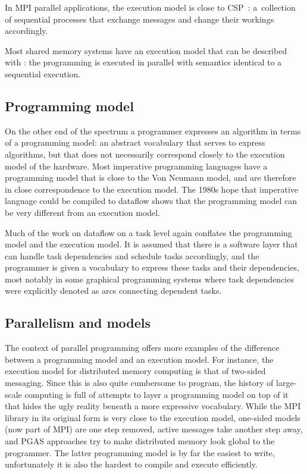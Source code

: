 \documentclass[11pt,fleqn,preprint]{impreport}
\begin{document}
In MPI parallel applications, the execution model is close to
\acf{CSP}~\cite{Hoare:csp}: a~collection of sequential processes that
exchange messages and change their workings accordingly.

Most shared memory systems have an execution model that can be described
with : the programming is executed in parallel
with semantics identical to a sequential execution.

\subsection{Programming model}

On the other end of the spectrum a programmer expresses an algorithm
in terms of a programming model: an abstract vocabulary that serves
to express algorithms, but that does not necessarily correspond
closely to the execution model of the hardware. Most imperative programming
languages have a programming model that is close to the Von Neumann model,
and are therefore in close correspondence to the execution model.
The 1980s hope that imperative language could be compiled to dataflow
shows that the programming model can be very different from an execution model.

Much of the work on dataflow on a task level again conflates the 
programming model and the execution model. It is assumed that there is a software
layer that can handle task dependencies and schedule tasks accordingly, 
and the programmer is given a vocabulary to express these tasks and their
dependencies, most notably in some graphical programming systems where
task dependencies were explicitly denoted as arcs connecting dependent tasks.

\subsection{Parallelism and models}

The context of parallel programming offers more examples of the difference between
a programming model and an execution model. For instance, the execution model
for distributed memory computing is that of two-sided messaging.
Since this is also quite cumbersome to program, the history of large-scale computing
is full of attempts to layer a programming model on top of it that hides the ugly
reality beneath a more expressive vocabulary. While the MPI library 
in its original form is very close 
to the execution model, one-sided models (now part of MPI) are one step 
removed, active messages take another step away, and PGAS approaches try to make
distributed memory look global to the programmer. The latter programming model
is by far the easiest to write, unfortunately it is also the hardest to compile
and execute efficiently.
\end{document}
